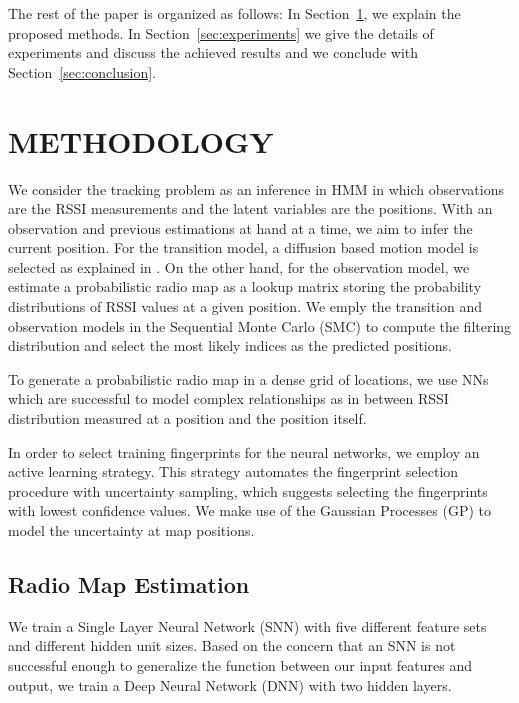 \documentclass{article}
\begin{document}
	
	The rest of the paper is organized as follows: In Section~\ref{sec:methodology}, we explain the proposed methods. In Section~\ref{sec:experiments} we give the details of experiments and discuss the achieved results and we conclude with Section~\ref{sec:conclusion}.
	
	\section{METHODOLOGY}
	\label{sec:methodology}
	We consider the tracking problem as an inference in HMM \cite{barberBRML2012} in which observations are the RSSI measurements and the latent variables are the positions. With an observation and previous estimations at hand at a time, we aim to infer the current position. For the transition model, a diffusion based motion model is selected as explained in \cite{Ser2017}. On the other hand, for the observation model, we estimate a probabilistic radio map as a lookup matrix storing the probability distributions of RSSI values at a given position. We emply the transition and observation models in the Sequential Monte Carlo (SMC) to compute the filtering distribution and select the most likely indices as the predicted positions.
	
	To generate a probabilistic radio map in a dense grid of locations, we use NNs which are successful to model complex relationships as in between RSSI distribution measured at a position and the position itself. 
	
	In order to select training fingerprints for the neural networks, we employ an active learning strategy. %
	This strategy automates the fingerprint selection procedure with uncertainty sampling, which suggests selecting the fingerprints with lowest confidence values. We make use of the Gaussian Processes (GP) to model the uncertainty at map positions.
	
	\subsection{Radio Map Estimation}
	We train a Single Layer Neural Network (SNN) with five different feature sets and different hidden unit sizes. Based on the concern that an SNN is not successful enough to generalize the function between our input features and output, we train a Deep Neural Network (DNN) with two hidden layers.
		
\end{document}
